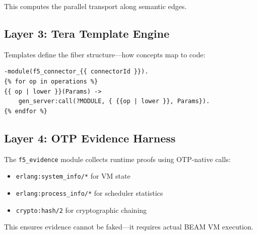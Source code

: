 This computes the parallel transport along semantic edges.

\subsection{Layer 3: Tera Template Engine}

Templates define the fiber structure---how concepts map to code:

\begin{lstlisting}
-module(f5_connector_{{ connectorId }}).
{% for op in operations %}
{{ op | lower }}(Params) ->
    gen_server:call(?MODULE, { {{op | lower }}, Params}).
{% endfor %}
\end{lstlisting}

\subsection{Layer 4: OTP Evidence Harness}

The \texttt{f5\_evidence} module collects runtime proofs using OTP-native calls:

\begin{itemize}
    \item \texttt{erlang:system\_info/*} for VM state
    \item \texttt{erlang:process\_info/*} for scheduler statistics
    \item \texttt{crypto:hash/2} for cryptographic chaining
\end{itemize}

This ensures evidence cannot be faked---it requires actual BEAM VM execution.
